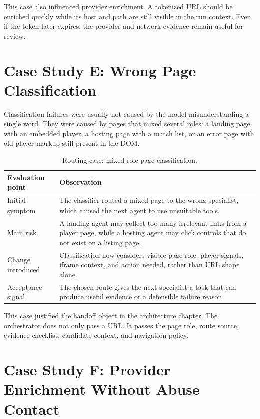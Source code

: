 This case also influenced provider enrichment. A tokenized URL should be
enriched quickly while its host and path are still visible in the run context.
Even if the token later expires, the provider and network evidence remain useful
for review.

\section{Case Study E: Wrong Page Classification}

Classification failures were usually not caused by the model misunderstanding a
single word. They were caused by pages that mixed several roles: a landing page
with an embedded player, a hosting page with a match list, or an error page with
old player markup still present in the DOM.

\begin{table}[!htbp]
\centering
\begin{tabularx}{\textwidth}{Q{3.8cm}Y}
\toprule
{}
Evaluation point & Observation \\
\midrule
Initial symptom & The classifier routed a mixed page to the wrong specialist,
which caused the next agent to use unsuitable tools. \\
Main risk & A landing agent may collect too many irrelevant links from a player
page, while a hosting agent may click controls that do not exist on a listing
page. \\
Change introduced & Classification now considers visible page role, player
signals, iframe context, and action needed, rather than URL shape alone. \\
Acceptance signal & The chosen route gives the next specialist a task that can
produce useful evidence or a defensible failure reason. \\
\bottomrule
\end{tabularx}
\caption{Routing case: mixed-role page classification.}
\label{tab:case-classification-mixed-role}
\end{table}

This case justified the handoff object in the architecture chapter. The
orchestrator does not only pass a URL. It passes the page role, route source,
evidence checklist, candidate context, and navigation policy.

\section{Case Study F: Provider Enrichment Without Abuse Contact}

